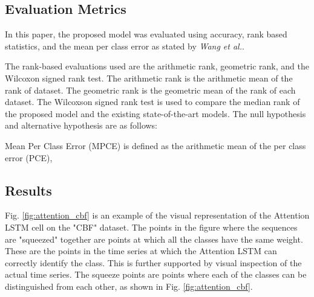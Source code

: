 \documentclass[article]{IEEEtran}
\begin{document}
\subsection{Evaluation Metrics}
In this paper, the proposed model was evaluated using accuracy, rank based statistics, and the mean per class error as stated by \textit{Wang et al.}\cite{wang2017time}.

The rank-based evaluations used are the arithmetic rank, geometric rank, and the Wilcoxon signed rank test. The arithmetic rank is the arithmetic mean of the rank of dataset. The geometric rank is the geometric mean of the rank of each dataset. The Wilcoxson signed rank test is used to compare the median rank of the proposed model and the existing state-of-the-art models. The null hypothesis and alternative hypothesis are as follows:


Mean Per Class Error (MPCE) is defined as the arithmetic mean of the per class error (PCE),

 


\subsection{Results}


Fig. \ref{fig:attention_cbf} is an example of the visual representation of the Attention LSTM cell on the "CBF" dataset.  The points in the figure where the sequences are "squeezed" together are points at which all the classes have the same weight. These are the points in the time series at which the Attention LSTM can correctly identify the class. This is further supported by visual inspection of the actual time series. The squeeze points are points where each of the classes can be distinguished from each other, as shown in Fig. \ref{fig:attention_cbf}.
















 \newcommand\mcxl[1]{\multicolumn{1}{|C|}{\bfseries #1}}
 \newcommand\mcx[1]{\multicolumn{1}{C }{\bfseries #1}}
 
\end{document}
